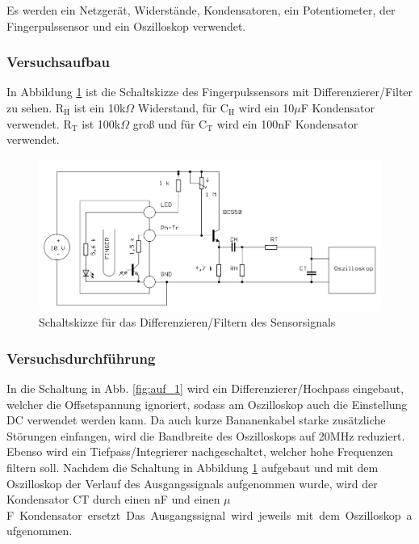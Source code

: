 \documentclass[12pt,a4paper]{article}
\begin{document}
Es werden ein Netzgerät, Widerstände, Kondensatoren, ein Potentiometer, der Fingerpulssensor und ein Oszilloskop verwendet.

\subsubsection*{Versuchsaufbau}

In Abbildung \ref{fig:auf_2} ist die Schaltskizze des Fingerpulssensors mit Differenzierer/Filter zu sehen. R$_\text{H}$ ist ein 10k$\Omega$ Widerstand, für C$_\text{H}$ wird ein 10$\mu$F Kondensator verwendet.  R$_\text{T}$ ist 100k$\Omega$ groß und für C$_\text{T}$ wird ein 100nF Kondensator verwendet.

\begin{figure}[H] 
	\centering
	\includegraphics[scale = 0.3]{auf_2.png}
	\caption[Schaltskizze für das Differenzieren/Filtern des Sensorsignals]{Schaltskizze für das Differenzieren/Filtern des Sensorsignals\footnotemark}
	\label{fig:auf_2}
\end{figure}

\subsubsection*{Versuchsdurchführung}
In die Schaltung  in Abb. \ref{fig:auf_1} wird ein Differenzierer/Hochpass  eingebaut, welcher die Offsetspannung ignoriert, sodass am Oszilloskop auch die Einstellung DC verwendet werden kann. Da auch kurze Bananenkabel starke zusätzliche Störungen einfangen, wird die Bandbreite des Oszilloskops auf 20MHz reduziert. Ebenso wird ein Tiefpass/Integrierer nachgeschaltet, welcher hohe Frequenzen filtern soll.
Nachdem die Schaltung in Abbildung \ref{fig:auf_2} aufgebaut und mit dem Oszilloskop der Verlauf des Ausgangssignals aufgenommen wurde, wird der Kondensator C$\text{T}$ durch einen \unit[10]{nF} und einen \unit[0,1]{$\mu$F} Kondensator ersetzt. Das Ausgangssignal wird jeweils mit dem Oszilloskop aufgenommen. 
\end{document}
